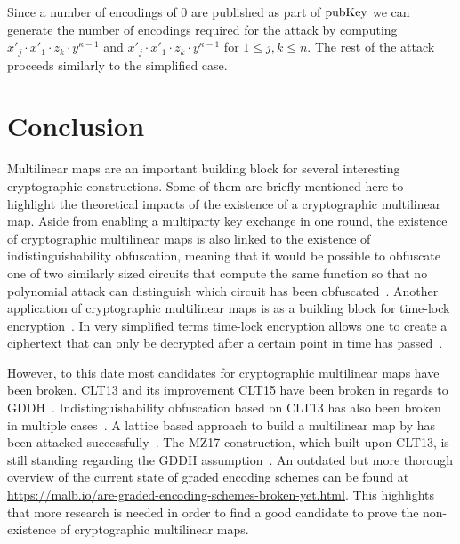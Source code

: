 \documentclass[english]{scrartcl}
\theoremstyle{plain}
\theoremstyle{definition}
\begin{document}
    Since a number of encodings of 0 are published as part of $\mathrm{pubKey}$ we can generate the number of encodings required for the attack by computing $x'_j \cdot x'_1 \cdot z_k \cdot y^{\kappa - 1}$ and $x'_j \cdot x'_1 \cdot z_k \cdot y^{\kappa - 1}$ for $1 \leq j, k \leq n$.
    The rest of the attack proceeds similarly to the simplified case.

    \section{Conclusion}
    Multilinear maps are an important building block for several interesting cryptographic constructions. Some of them are briefly mentioned here to highlight the theoretical impacts of the existence of a cryptographic multilinear map.
    Aside from enabling a multiparty key exchange in one round, the existence of cryptographic multilinear maps is also linked to the existence of indistinguishability obfuscation, meaning that it would be possible to obfuscate one of two similarly sized circuits that compute the same function so that no polynomial attack can distinguish which circuit has been obfuscated~\cite{albrecht2020multilinear}.
    Another application of cryptographic multilinear maps is as a building block for time-lock encryption~\cite{liu2018build}. In very simplified terms time-lock encryption allows one to create a ciphertext that can only be decrypted after a certain point in time has passed~\cite{liu2018build}.

    However, to this date most candidates for cryptographic multilinear maps have been broken. CLT13 and its improvement CLT15 have been broken in regards to GDDH~\cite{cryptoeprint:2014:906,cryptoeprint:2016:135}. Indistinguishability obfuscation based on CLT13 has also been broken in multiple cases~\cite{cryptoeprint:2019:1254,cryptoeprint:2019:309}.
    A lattice based approach to build a multilinear map by \citeauthor*{cryptoeprint:mm_gentry} has been attacked successfully~\cite*{cryptoeprint:ggh_attack}.
    The MZ17 construction, which built upon CLT13, is still standing regarding the GDDH assumption~\cite{cryptoeprint:2017:946}.
    An outdated but more thorough overview of the current state of graded encoding schemes can be found at \url{https://malb.io/are-graded-encoding-schemes-broken-yet.html}. This highlights that more research is needed in order to find a good candidate to prove the non-existence of cryptographic multilinear maps.

    \printbibliography
\end{document}
